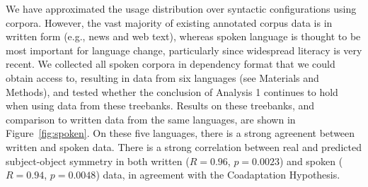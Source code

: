 \documentclass[11pt,a4paper]{article}
\newcommand\comment[1]{{\color{red}#1}}
\newcommand\mhahn[1]{{\color{red}(#1)}}
\begin{document}


We have approximated the usage distribution over syntactic configurations using corpora.
However, the vast majority of existing annotated corpus data is in written form (e.g., news and web text), whereas spoken language is thought to be most important for language change, particularly since widespread literacy is very recent.
We collected all spoken corpora in dependency format that we could obtain access to, resulting in data from six languages (see Materials and Methods), and tested whether the conclusion of Analysis 1 continues to hold when using data from these treebanks.
Results on these treebanks, and comparison to written data from the same languages, are shown in Figure~\ref{fig:spoken}.
On these five languages, there is a strong agreenent between written and spoken data.
There is a strong correlation between real and predicted subject-object symmetry in both written ($R=0.96$, $p=0.0023$) and spoken ($R=0.94$, $p=0.0048$) data, in agreement with the Coadaptation Hypothesis.





\end{document}
